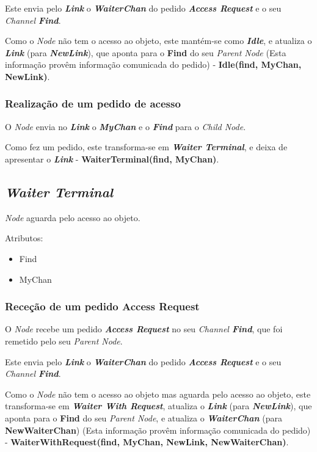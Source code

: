 Este envia pelo \textbf{\emph{Link}} o \textbf{\emph{WaiterChan}} do pedido \emph{\textbf{Access Request}} e o seu \emph{Channel \textbf{Find}}.

Como o \emph{Node} não tem o acesso ao objeto, este mantém-se como \emph{\textbf{Idle}}, e atualiza o \textbf{\emph{Link}} (para \textbf{\emph{NewLink}}), que aponta para o \textbf{Find} do seu \emph{Parent Node} (Esta informação provêm informação comunicada do pedido) - \textbf{Idle(find, MyChan, NewLink)}.



\subsubsection*{Realização de um pedido de acesso}
O \emph{Node} envia no \textbf{\emph{Link}} o \textbf{\emph{MyChan}} e o \textbf{\emph{Find}} para o \emph{Child Node}.

Como fez um pedido, este transforma-se em \emph{\textbf{Waiter Terminal}}, e deixa de apresentar o \textbf{\emph{Link}} - \textbf{WaiterTerminal(find, MyChan)}.

\subsection{\emph{Waiter Terminal}}
\label{especificacao:nodes:waiter_terminal}

\emph{Node} aguarda pelo acesso ao objeto.

Atributos:
\begin{itemize}
    \item Find
    \item MyChan
\end{itemize}

\subsubsection*{Receção de um pedido Access Request}
O \emph{Node} recebe um pedido \emph{\textbf{Access Request}} no seu \emph{Channel \textbf{Find}}, que foi remetido pelo seu \emph{Parent Node}.

Este envia pelo \textbf{\emph{Link}} o \textbf{\emph{WaiterChan}} do pedido \emph{\textbf{Access Request}} e o seu \emph{Channel \textbf{Find}}.

Como o \emph{Node} não tem o acesso ao objeto mas aguarda pelo acesso ao objeto, este transforma-se em \emph{\textbf{Waiter With Request}}, atualiza o \textbf{\emph{Link}} (para \textbf{\emph{NewLink}}), que aponta para o \textbf{Find} do seu \emph{Parent Node}, e atualiza o \textbf{\emph{WaiterChan}} (para \textbf{NewWaiterChan}) (Esta informação provêm informação comunicada do pedido) - \textbf{WaiterWithRequest(find, MyChan, NewLink, NewWaiterChan)}.


